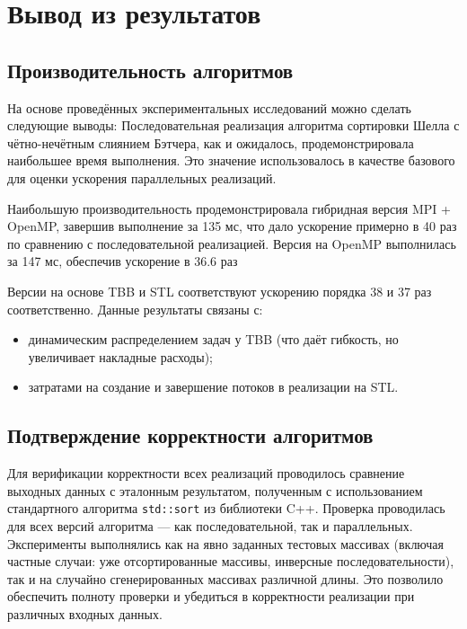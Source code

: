 \documentclass[a4paper,12pt]{article}
\begin{document}
\section{Вывод из результатов}

\subsection{Производительность алгоритмов}
На основе проведённых экспериментальных исследований можно сделать следующие выводы:
Последовательная реализация алгоритма сортировки Шелла с чётно-нечётным слиянием Бэтчера, как и ожидалось, продемонстрировала наибольшее время выполнения. Это значение использовалось в качестве базового для оценки ускорения параллельных реализаций.

Наибольшую производительность продемонстрировала гибридная версия MPI + OpenMP, завершив выполнение за 135 мс, что дало ускорение примерно в 40 раз по сравнению с последовательной реализацией. Версия на OpenMP выполнилась за 147 мс, обеспечив ускорение в 36.6 раз

Версии на основе TBB и STL соответствуют ускорению порядка 38 и 37 раз соответственно. Данные результаты связаны с:

  \begin{itemize}
    \item динамическим распределением задач у TBB (что даёт гибкость, но увеличивает накладные расходы);
    \item затратами на создание и завершение потоков в реализации на STL.
  \end{itemize}

\subsection{Подтверждение корректности алгоритмов}
Для верификации корректности всех реализаций проводилось сравнение выходных данных с эталонным результатом, полученным с использованием стандартного алгоритма \texttt{std::sort} из библиотеки C++. Проверка проводилась для всех версий алгоритма — как последовательной, так и параллельных.
Эксперименты выполнялись как на явно заданных тестовых массивах (включая частные случаи: уже отсортированные массивы, инверсные последовательности), так и на случайно сгенерированных массивах различной длины. Это позволило обеспечить полноту проверки и убедиться в корректности реализации при различных входных данных.
\newpage
\end{document}
